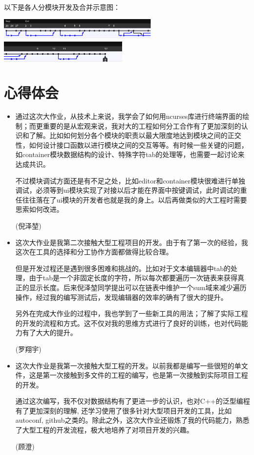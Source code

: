 \documentclass[a4paper,9pt]{article}
\begin{document}
以下是各人分模块开发及合并示意图：
\vspace{1.5em}
\begin{center}
	\includegraphics[height=1.1cm]{branch1.png}
	\includegraphics[height=1.1cm]{branch2.png}
\end{center}

\vspace{2em}
\section{心得体会}
\begin{itemize}
	\item
通过这次大作业，从技术上来说，我学会了如何用ncurses库进行终端界面的绘制；而更重要的是从宏观来说，我对大的工程如何分工合作有了更加深刻的认识和了解。比如如何划分各个模块的职责以最大限度地达到模块之间的正交性，如何设计接口函数以进行模块之间的交互等等。有时候一些关键的问题，如container模块数据结构的设计、特殊字符tab的处理等，也需要一起讨论来达成共识。

不过模块调试方面还是有不足之处，比如editor和container模块很难进行单独调试，必须等到ui模块实现了对接以后才能在界面中按键调试，此时调试的重任往往落在了ui模块的开发者也就是我的身上。以后再做类似的大工程时需要思索如何改进。

(倪泽堃)
	\item 
这次大作业是我第二次接触大型工程项目的开发。由于有了第一次的经验，我这次在工具的选择和分工协作方面都做得比较合理。

但是开发过程还是遇到很多困难和挑战的。比如对于文本编辑器中tab的处理，由于tab是一个非固定长度的字符，所以每次都要遍历一次链表来获得真正的显示长度。后来倪泽堃同学提出可以在链表中维护一个sum域来减少遍历操作，经过我的编写测试后，发现编辑器的效率的确有了很大的提升。

另外在完成大作业的过程中，我也学到了一些新工具的用法；了解了实际工程的开发的流程和方式。这不仅对我的思维方式进行了良好的训练，也对代码能力有了大大的提升。

(罗翔宇)
	\item
这次大作业是我第一次接触大型工程的开发。以前我都是编写一些很短的单文件，这是第一次接触到多文件的工程的编写，也是第一次接触到实际项目工程的开发。

通过这次编写，我不仅对数据结构有了更进一步的认识，也对C++的泛型编程有了更加深刻的理解, 还学习使用了很多针对大型项目开发的工具，比如autoconf, github之类的。除此之外，这次大作业还锻炼了我的代码能力，熟悉了大型工程的开发流程，极大地培养了对项目开发的兴趣。

(顾澄)
\end{itemize}
\end{document}
